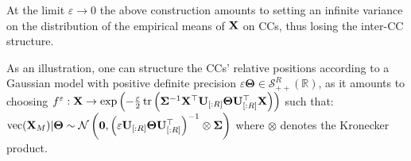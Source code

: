 \begin{remark}
At the limit $\varepsilon \to 0$ the above construction amounts to setting an infinite variance on the distribution of the empirical means of $\mathbf{X}$ on CCs, thus losing the inter-CC structure. 
\end{remark}

As an illustration, one can structure the CCs' relative positions according to a Gaussian model with positive definite precision $\varepsilon \bm{\Theta} \in \mathcal{S}_{++}^R(\mathbb{R})$, as it amounts to choosing $f^{\varepsilon} : \mathbf{X} \to \exp \left(-\frac{\varepsilon}{2} \operatorname{tr}\left(\mathbf{\Sigma}^{-1}\mathbf{X}^\top\mathbf{U}_{[:R]}  \bm{\Theta}\mathbf{U}^\top_{[:R]} \mathbf{X}\right)\right)$ such that: $\mathrm{vec}(\mathbf{X}_{M}) | \bm{\Theta} \sim \mathcal{N}\left(\bm{0}, \left(\varepsilon \mathbf{U}_{[:R]}  \bm{\Theta}\mathbf{U}^\top_{[:R]}\right)^{-1} \otimes \mathbf{\Sigma}\right)$ where $\otimes$ denotes the Kronecker product.